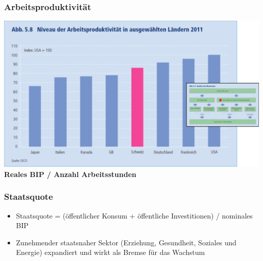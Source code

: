\begin{multicols}{2}
\subsubsection{Arbeitsproduktivität}
\includegraphics[width=\linewidth]{images/arbeitsproduktivitaet.png}
\textbf{Reales BIP / Anzahl Arbeitsstunden}
\columnbreak
\subsubsection{Staatsquote}
\begin{itemize}
	\item Staatsquote = (öffentlicher Konsum + öffentliche Investitionen) / nominales BIP
	\item Zunehmender staatsnaher Sektor (Erziehung, Gesundheit, Soziales und Energie) expandiert und wirkt als Bremse für das Wachstum
\end{itemize}
\end{multicols}


